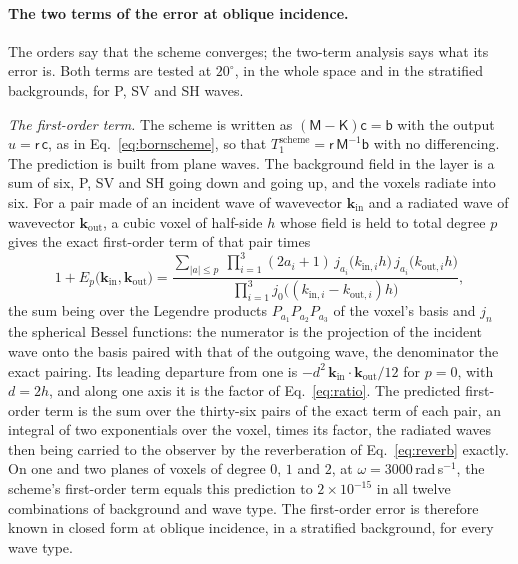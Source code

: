 \documentclass[11pt,a4paper]{article}
\begin{document}
\paragraph{The two terms of the error at oblique incidence.} The orders say that the scheme
converges; the two-term analysis says what its error is. Both terms are tested at $20^\circ$, in the
whole space and in the stratified backgrounds, for P, SV and SH waves.

\emph{The first-order term.} The scheme is written as $(\mathsf{M}-\mathsf{K})\mathsf{c}=\mathsf{b}$ with
the output $u=\mathsf{r}\,\mathsf{c}$, as in Eq.~\eqref{eq:bornscheme}, so that
$T_1^{\text{scheme}}=\mathsf{r}\,\mathsf{M}^{-1}\mathsf{b}$ with no differencing. The prediction is built
from plane waves. The background field in the layer is a sum of six, P, SV and SH going down and going
up, and the voxels radiate into six. For a pair made of an incident wave of wavevector
$\mathbf{k}_{\text{in}}$ and a radiated wave of wavevector $\mathbf{k}_{\text{out}}$, a cubic voxel of
half-side $h$ whose field is held to total degree $p$ gives the exact first-order term of that pair
times
\begin{equation}\label{eq:wavefactor}
  1+E_p\bigl(\mathbf{k}_{\text{in}},\mathbf{k}_{\text{out}}\bigr)
  =\frac{\displaystyle\sum_{|a|\le p}\ \prod_{i=1}^{3}(2a_i+1)\,
        j_{a_i}\bigl(k_{\text{in},i}h\bigr)\,j_{a_i}\bigl(k_{\text{out},i}h\bigr)}
       {\displaystyle\prod_{i=1}^{3}j_0\bigl((k_{\text{in},i}-k_{\text{out},i})h\bigr)},
\end{equation}
the sum being over the Legendre products $P_{a_1}P_{a_2}P_{a_3}$ of the voxel's basis and $j_n$ the
spherical Bessel functions: the numerator is the projection of the incident wave onto the basis paired
with that of the outgoing wave, the denominator the exact pairing. Its leading departure from one is
$-d^2\,\mathbf{k}_{\text{in}}\cdot\mathbf{k}_{\text{out}}/12$ for $p=0$, with $d=2h$, and along one axis it is the
factor of Eq.~\eqref{eq:ratio}. The predicted first-order term is the sum over the thirty-six pairs of
the exact term of each pair, an integral of two exponentials over the voxel, times its factor, the
radiated waves then being carried to the observer by the reverberation of Eq.~\eqref{eq:reverb}
exactly. On one and two planes of voxels of degree $0$, $1$ and $2$, at
$\omega=3000$\,rad\,s$^{-1}$, the scheme's first-order term equals this prediction to
$2\times10^{-15}$ in all twelve combinations of background and wave type. The first-order error is
therefore known in closed form at oblique incidence, in a stratified background, for every wave type.
\end{document}
